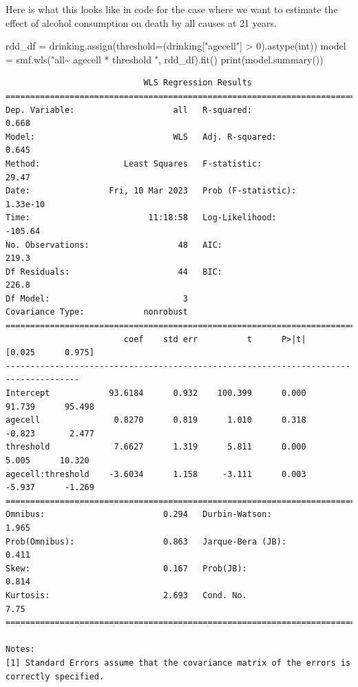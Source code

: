 \documentclass[
  letterpaper,
  DIV=11,
  numbers=noendperiod]{scrreprt}
\newenvironment{Shaded}{\begin{snugshade}}{\end{snugshade}}
\newcommand{\BuiltInTok}[1]{\textcolor[rgb]{0.00,0.23,0.31}{#1}}
\newcommand{\DecValTok}[1]{\textcolor[rgb]{0.68,0.00,0.00}{#1}}
\newcommand{\NormalTok}[1]{\textcolor[rgb]{0.00,0.23,0.31}{#1}}
\newcommand{\OperatorTok}[1]{\textcolor[rgb]{0.37,0.37,0.37}{#1}}
\newcommand{\StringTok}[1]{\textcolor[rgb]{0.13,0.47,0.30}{#1}}
\begin{document}
Here is what this looks like in code for the case where we want to
estimate the effect of alcohol consumption on death by all causes at 21
years.

\begin{Shaded}
\begin{Highlighting}[]
\NormalTok{rdd\_df }\OperatorTok{=}\NormalTok{ drinking.assign(threshold}\OperatorTok{=}\NormalTok{(drinking[}\StringTok{"agecell"}\NormalTok{] }\OperatorTok{\textgreater{}} \DecValTok{0}\NormalTok{).astype(}\BuiltInTok{int}\NormalTok{))}
\NormalTok{model }\OperatorTok{=}\NormalTok{ smf.wls(}\StringTok{"all\textasciitilde{} agecell * threshold "}\NormalTok{, rdd\_df).fit()}
\BuiltInTok{print}\NormalTok{(model.summary())}
\end{Highlighting}
\end{Shaded}

\begin{verbatim}
                            WLS Regression Results                            
==============================================================================
Dep. Variable:                    all   R-squared:                       0.668
Model:                            WLS   Adj. R-squared:                  0.645
Method:                 Least Squares   F-statistic:                     29.47
Date:                Fri, 10 Mar 2023   Prob (F-statistic):           1.33e-10
Time:                        11:18:58   Log-Likelihood:                -105.64
No. Observations:                  48   AIC:                             219.3
Df Residuals:                      44   BIC:                             226.8
Df Model:                           3                                         
Covariance Type:            nonrobust                                         
=====================================================================================
                        coef    std err          t      P>|t|      [0.025      0.975]
-------------------------------------------------------------------------------------
Intercept            93.6184      0.932    100.399      0.000      91.739      95.498
agecell               0.8270      0.819      1.010      0.318      -0.823       2.477
threshold             7.6627      1.319      5.811      0.000       5.005      10.320
agecell:threshold    -3.6034      1.158     -3.111      0.003      -5.937      -1.269
==============================================================================
Omnibus:                        0.294   Durbin-Watson:                   1.965
Prob(Omnibus):                  0.863   Jarque-Bera (JB):                0.411
Skew:                           0.167   Prob(JB):                        0.814
Kurtosis:                       2.693   Cond. No.                         7.75
==============================================================================

Notes:
[1] Standard Errors assume that the covariance matrix of the errors is correctly specified.
\end{verbatim}
\end{document}
